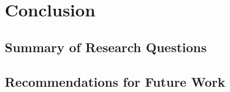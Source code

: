 \chapter{Conclusion}
\label{chap:Conclusion}

\section{Summary of Research Questions}
\section{Recommendations for Future Work}
